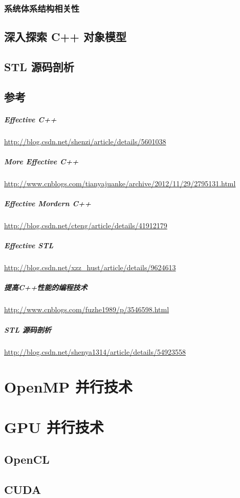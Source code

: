 \documentclass[UTF8,a4paper,12pt]{ctexbook}
\begin{document}
		\subsection{系统体系结构相关性}

	\section{深入探索 C++ 对象模型}
	
	\section{STL 源码剖析}
	
	\section{参考}
		\paragraph{Effective C++} \url{http://blog.csdn.net/shenzi/article/details/5601038}
		
		\paragraph{More Effective C++} \url{http://www.cnblogs.com/tianyajuanke/archive/2012/11/29/2795131.html}
		
		\paragraph{Effective Mordern C++} \url{http://blog.csdn.net/cteng/article/details/41912179}
		
		\paragraph{Effective STL} \url{http://blog.csdn.net/xzz_hust/article/details/9624613}
		
		\paragraph{提高C++性能的编程技术} \url{http://www.cnblogs.com/fuzhe1989/p/3546598.html}
		
		\paragraph{STL 源码剖析} \url{http://blog.csdn.net/shenya1314/article/details/54923558}
\chapter{OpenMP 并行技术}


\chapter{GPU 并行技术}
	\section{OpenCL}
	
	\section{CUDA}
\end{document}
